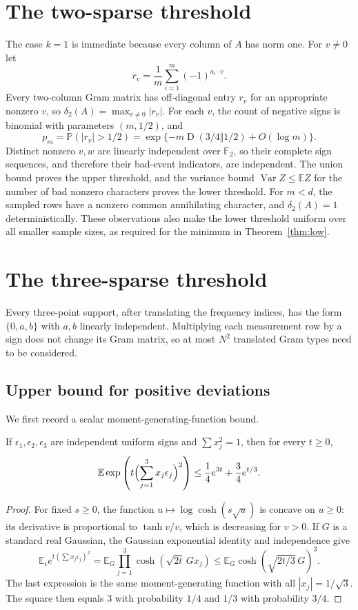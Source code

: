 \documentclass[11pt]{article}
\theoremstyle{remark}\newtheorem{remark}[theorem]{Remark}
\newcommand{\F}{\mathbb F}\newcommand{\R}{\mathbb R}\newcommand{\C}{\mathbb C}
\newcommand{\E}{\mathbb E}\newcommand{\Prob}{\mathbb P}
\newcommand{\Var}{\operatorname{Var}}\newcommand{\KL}{\operatorname{D}}
\begin{document}
\section{The two-sparse threshold}
The case $k=1$ is immediate because every column of $A$ has norm one. For $v\ne0$ let
\[
 r_v=\frac1m\sum_{i=1}^m(-1)^{a_i\cdot v}.
\]
Every two-column Gram matrix has off-diagonal entry $r_v$ for an appropriate nonzero $v$, so $\delta_2(A)=\max_{v\ne0}|r_v|$. For each $v$, the count of negative signs is binomial with parameters $(m,1/2)$, and
\[
 p_m=\Prob(|r_v|>1/2)=\exp\{-m\KL(3/4\Vert1/2)+O(\log m)\}.
\]
Distinct nonzero $v,w$ are linearly independent over $\F_2$, so their complete sign sequences, and therefore their bad-event indicators, are independent. The union bound proves the upper threshold, and the variance bound $\Var Z\le\E Z$ for the number of bad nonzero characters proves the lower threshold. For $m<d$, the sampled rows have a nonzero common annihilating character, and $\delta_2(A)=1$ deterministically. These observations also make the lower threshold uniform over all smaller sample sizes, as required for the minimum in Theorem~\ref{thm:low}.

\section{The three-sparse threshold}
Every three-point support, after translating the frequency indices, has the form $\{0,a,b\}$ with $a,b$ linearly independent. Multiplying each measurement row by a sign does not change its Gram matrix, so at most $N^2$ translated Gram types need to be considered.

\subsection{Upper bound for positive deviations}
We first record a scalar moment-generating-function bound.

\begin{lemma}\label{lem:mgf}
If $\epsilon_1,\epsilon_2,\epsilon_3$ are independent uniform signs and $\sum x_j^2=1$, then for every $t\ge0$,
\[
 \E\exp\left(t\Bigl(\sum_{j=1}^3x_j\epsilon_j\Bigr)^2\right)
 \le\frac14e^{3t}+\frac34e^{t/3}.
\]
\end{lemma}
\begin{proof}
For fixed $s\ge0$, the function $u\mapsto\log\cosh(s\sqrt u)$ is concave on $u\ge0$: its derivative is proportional to $\tanh v/v$, which is decreasing for $v>0$. If $G$ is a standard real Gaussian, the Gaussian exponential identity and independence give
\[
 \E_\epsilon e^{t(\sum x_j\epsilon_j)^2}
 =\E_G\prod_{j=1}^3\cosh(\sqrt{2t}\,Gx_j)
 \le\E_G\cosh(\sqrt{2t/3}\,G)^3.
\]
The last expression is the same moment-generating function with all $|x_j|=1/\sqrt3$. The square then equals $3$ with probability $1/4$ and $1/3$ with probability $3/4$.
\end{proof}
\end{document}
